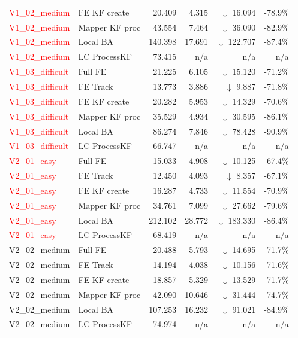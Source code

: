 \documentclass[11pt]{article}
\begin{document}
\begin{longtable}{llrrrr}
\textcolor{red}{V1\_02\_medium} & FE KF create & 20.409 & 4.315 & $\downarrow$ 16.094 & -78.9\% \\
\textcolor{red}{V1\_02\_medium} & Mapper KF proc & 43.554 & 7.464 & $\downarrow$ 36.090 & -82.9\% \\
\textcolor{red}{V1\_02\_medium} & Local BA & 140.398 & 17.691 & $\downarrow$ 122.707 & -87.4\% \\
\textcolor{red}{V1\_02\_medium} & LC ProcessKF & 73.415 & n/a & n/a & n/a \\
\textcolor{red}{V1\_03\_difficult} & Full FE & 21.225 & 6.105 & $\downarrow$ 15.120 & -71.2\% \\
\textcolor{red}{V1\_03\_difficult} & FE Track & 13.773 & 3.886 & $\downarrow$ 9.887 & -71.8\% \\
\textcolor{red}{V1\_03\_difficult} & FE KF create & 20.282 & 5.953 & $\downarrow$ 14.329 & -70.6\% \\
\textcolor{red}{V1\_03\_difficult} & Mapper KF proc & 35.529 & 4.934 & $\downarrow$ 30.595 & -86.1\% \\
\textcolor{red}{V1\_03\_difficult} & Local BA & 86.274 & 7.846 & $\downarrow$ 78.428 & -90.9\% \\
\textcolor{red}{V1\_03\_difficult} & LC ProcessKF & 66.747 & n/a & n/a & n/a \\
\textcolor{red}{V2\_01\_easy} & Full FE & 15.033 & 4.908 & $\downarrow$ 10.125 & -67.4\% \\
\textcolor{red}{V2\_01\_easy} & FE Track & 12.450 & 4.093 & $\downarrow$ 8.357 & -67.1\% \\
\textcolor{red}{V2\_01\_easy} & FE KF create & 16.287 & 4.733 & $\downarrow$ 11.554 & -70.9\% \\
\textcolor{red}{V2\_01\_easy} & Mapper KF proc & 34.761 & 7.099 & $\downarrow$ 27.662 & -79.6\% \\
\textcolor{red}{V2\_01\_easy} & Local BA & 212.102 & 28.772 & $\downarrow$ 183.330 & -86.4\% \\
\textcolor{red}{V2\_01\_easy} & LC ProcessKF & 68.419 & n/a & n/a & n/a \\
V2\_02\_medium & Full FE & 20.488 & 5.793 & $\downarrow$ 14.695 & -71.7\% \\
V2\_02\_medium & FE Track & 14.194 & 4.038 & $\downarrow$ 10.156 & -71.6\% \\
V2\_02\_medium & FE KF create & 18.857 & 5.329 & $\downarrow$ 13.529 & -71.7\% \\
V2\_02\_medium & Mapper KF proc & 42.090 & 10.646 & $\downarrow$ 31.444 & -74.7\% \\
V2\_02\_medium & Local BA & 107.253 & 16.232 & $\downarrow$ 91.021 & -84.9\% \\
V2\_02\_medium & LC ProcessKF & 74.974 & n/a & n/a & n/a \\
\end{longtable}
\end{document}
